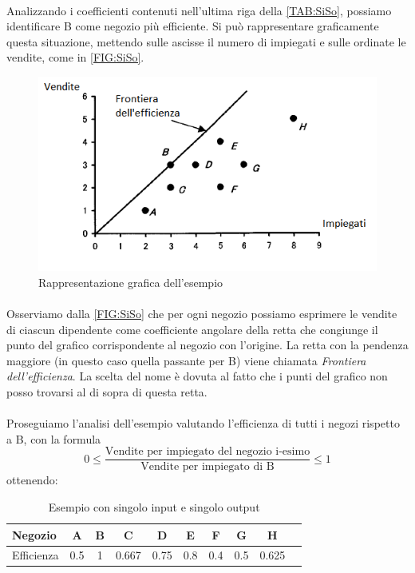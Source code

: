 \paragraph{} Analizzando i coefficienti contenuti nell'ultima riga della \autoref{TAB:SiSo}, possiamo identificare B come negozio pi\`u efficiente. Si pu\`o rappresentare graficamente questa situazione, mettendo sulle ascisse il numero di impiegati e sulle ordinate le vendite, come in \autoref{FIG:SiSo}.

\begin{figure}[H]
\centering
\includegraphics[scale=1]{Img/GraficoSISO.png}
\caption{Rappresentazione grafica dell'esempio}\label{FIG:SiSo}
\end{figure}

\paragraph{}Osserviamo dalla \autoref{FIG:SiSo} che per ogni negozio possiamo esprimere le vendite di ciascun dipendente come coefficiente angolare della retta che congiunge il punto del grafico corrispondente al negozio con l'origine. La retta con la pendenza maggiore (in questo caso quella passante per B) viene chiamata \emph{Frontiera dell'efficienza}. La scelta del nome \`e dovuta al fatto che i punti del grafico non posso trovarsi al di sopra di questa retta.

\paragraph{} Proseguiamo l'analisi dell'esempio valutando l'efficienza di tutti i negozi rispetto a B, con la formula
\begin{equation}\label{EQ:siso}
0\leq \dfrac{\text{Vendite per impiegato del negozio i-esimo}}{\text{Vendite per impiegato di B}} \leq 1
\end{equation}
ottenendo:
\begin{table}[H]
\centering
\begin{tabular}{lccccccccc}
\hline 
Negozio & A & B & C & D & E & F & G & H \\ 
\hline 
Efficienza & 0.5 & 1 & 0.667 & 0.75 & 0.8 & 0.4 & 0.5 & 0.625 \\ 
\hline 
\end{tabular}
\caption{Esempio con singolo input e singolo output} \label{TAB:SiSoContratta}
\end{table}

